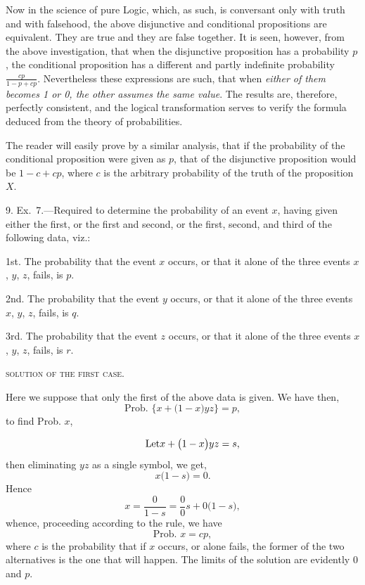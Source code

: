 \documentclass[oneside]{book}
\begin{document}
Now in the science of pure Logic, which, as such, is conversant
only with truth and with falsehood, the above disjunctive
and conditional propositions are equivalent. They are true and
they are false together. It is seen, however, from the above investigation,
that when the disjunctive proposition has a probability
$p$, the conditional proposition has a different and partly indefinite
probability $\frac{cp}{1-p+cp}$. Nevertheless these expressions
are such, that when \emph{either of them becomes 1 or 0, the other assumes
the same value}. The results are, therefore, perfectly consistent,
and the logical transformation serves to verify the formula
deduced from the theory of probabilities.

The reader will easily prove by a similar analysis, that if the
probability of the conditional proposition were given as $p$, that
of the disjunctive proposition would be $1-c+cp$, where $c$ is the
arbitrary probability of the truth of the proposition $X$.

9. Ex.~7.---Required to determine the probability of an event
$x$, having given either the first, or the first and second, or the
first, second, and third of the following data, viz.:

1st. The probability that the event $x$ occurs, or that it alone
of the three events $x$, $y$, $z$, fails, is $p$.

2nd. The probability that the event $y$ occurs, or that it alone
of the three events $x$, $y$, $z$, fails, is $q$.

3rd. The probability that the event $z$ occurs, or that it alone
of the three events $x$, $y$, $z$, fails, is $r$.


\begin{center}\textsc{solution of the first case.}\end{center}

Here we suppose that only the first of the above data is
given.
We have then,
\[
  \textrm{Prob. }\{x + \bigl( 1 - x \bigr) yz\} = p,
\]
to find Prob. $x$,

\[
  \qquad\textrm{Let}\hfill  x + \bigl( 1 - x \bigr) yz = s, \hfill
\]
then eliminating $yz$ as a single symbol, we get,
\begin{equation*}
x\bigl( 1 - s \bigr) = 0.
\end{equation*}
Hence
\begin{equation*}
x = \frac{0}{1-s} = \frac{0}{0}s + 0\bigl( 1-s \bigr),
\end{equation*}
whence, proceeding according to the rule, we have
\[
  \textrm{Prob. }x = cp,    \tag{1}
\]
where $c$ is the probability that if $x$ occurs, or alone fails, the
former of the two alternatives is the one that will happen. The
limits of the solution are evidently $0$ and $p$.
\end{document}
